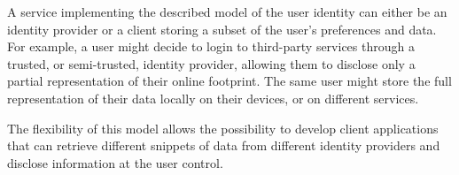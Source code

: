 A service implementing the described model of the user identity can either be an identity provider or a client storing a subset of the user's preferences and data. For example, a user might decide to login to third-party services through a trusted, or semi-trusted, identity provider, allowing them to disclose only a partial representation of their online footprint. The same user might store the full representation of their data locally on their devices, or on different services.

The flexibility of this model allows the possibility to develop client applications that can retrieve different snippets of data from different identity providers and disclose information at the user control. 
